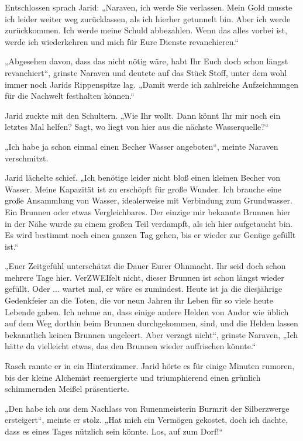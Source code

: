 Entschlossen sprach Jarid: „Naraven, ich werde Sie verlassen. Mein Gold musste ich leider weiter weg zurücklassen, als ich hierher getunnelt bin. Aber ich werde zurückkommen. Ich werde meine Schuld abbezahlen. Wenn das alles vorbei ist, werde ich wiederkehren und mich für Eure Dienste revanchieren.“

„Abgesehen davon, dass das nicht nötig wäre, habt Ihr Euch doch schon längst revanchiert“, grinste Naraven und deutete auf das Stück Stoff, unter dem wohl immer noch Jarids Rippenspitze lag. „Damit werde ich zahlreiche Aufzeichnungen für die Nachwelt festhalten können.“

Jarid zuckte mit den Schultern. „Wie Ihr wollt. Dann könnt Ihr mir noch ein letztes Mal helfen? Sagt, wo liegt von hier aus die nächste Wasserquelle?“

„Ich habe ja schon einmal einen Becher Wasser angeboten“, meinte Naraven verschmitzt.

Jarid lächelte schief. „Ich benötige leider nicht bloß einen kleinen Becher von Wasser. Meine Kapazität ist zu erschöpft für große Wunder. Ich brauche eine große Ansammlung von Wasser, idealerweise mit Verbindung zum Grundwasser. Ein Brunnen oder etwas Vergleichbares. Der einzige mir bekannte Brunnen hier in der Nähe wurde zu einem großen Teil verdampft, als ich hier aufgetaucht bin. Es wird bestimmt noch einen ganzen Tag gehen, bis er wieder zur Genüge gefüllt ist.“

„Euer Zeitgefühl unterschätzt die Dauer Eurer Ohnmacht. Ihr seid doch schon mehrere Tage hier. VerZWEIfelt nicht, dieser Brunnen ist schon längst wieder gefüllt. Oder ... wartet mal, er wäre es zumindest. Heute ist ja die diesjährige Gedenkfeier an die Toten, die vor neun Jahren ihr Leben für so viele heute Lebende gaben. Ich nehme an, dass einige andere Helden von Andor wie üblich auf dem Weg dorthin beim Brunnen durchgekommen, sind, und die Helden lassen bekanntlich keinen Brunnen ungeleert. Aber verzagt nicht“, grinste Naraven, „Ich hätte da vielleicht etwas, das den Brunnen wieder auffrischen könnte.“

Rasch rannte er in ein Hinterzimmer. Jarid hörte es für einige Minuten rumoren, bis der kleine Alchemist reemergierte und triumphierend einen grünlich schimmernden Meißel präsentierte.

„Den habe ich aus dem Nachlass von Runenmeisterin Burmrit der Silberzwerge ersteigert“, meinte er stolz. „Hat mich ein Vermögen gekostet, doch ich dachte, dass es eines Tages nützlich sein könnte. Los, auf zum Dorf!“\bigskip






